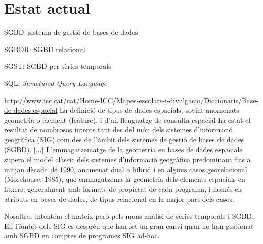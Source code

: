 \chapter{Estat actual} %
\label{cap:estat}


SGBD: sistema de gestió de bases de dades

SGBDR: SGBD relacional

SGST: SGBD per sèries temporals

SQL: \emph{Structured Query Language}



\url{http://www.icc.cat/cat/Home-ICC/Mapes-escolars-i-divulgacio/Diccionaris/Base-de-dades-espacial}
La definició de tipus de dades espacials, sovint anomenats geometria o element (feature), i d'un llenguatge de consulta espacial ha estat el resultat de nombrosos intents tant des del món dels sistemes d’informació geogràfica (SIG) com des de l'àmbit dels sistemes de gestió de bases de dades (SGBD). [...]
L'emmagatzematge de la geometria en bases de dades espacials supera el model clàssic dels sistemes d'informació geogràfica predominant fins a mitjan dècada de 1990, anomenat dual o híbrid i en alguns casos georelacional (Morehouse, 1985), que emmagatzema la geometria dels elements espacials en fitxers, generalment amb formats de propietat de cada programa, i només els atributs en bases de dades, de tipus relacional en la major part dels casos.


Nosaltres intentem el mateix però pels mons anàlisi de sèries temporals i SGBD.
En l'àmbit dels SIG es desprèn que han fet un gran canvi quan ho han gestionat amb SGBD en comptes de programes SIG ad-hoc.










  

